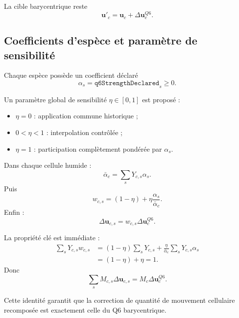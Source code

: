 \documentclass[11pt,a4paper]{article}
\newcommand{\vect}[1]{\bm{#1}}
\begin{document}
La cible barycentrique reste
\begin{equation}
  \vect{u}'_c=\vect{u}_c+\Delta\vect{u}^{Q6}_c.
\end{equation}

\subsection{Coefficients d'espèce et paramètre de sensibilité}

Chaque espèce possède un coefficient déclaré
\begin{equation}
  \alpha_s = \texttt{q6StrengthDeclared}_s \ge 0.
\end{equation}

Un paramètre global de sensibilité \(\eta\in[0,1]\) est proposé :
\begin{itemize}
  \item \(\eta=0\) : application commune historique ;
  \item \(0<\eta<1\) : interpolation contrôlée ;
  \item \(\eta=1\) : participation complètement pondérée par \(\alpha_s\).
\end{itemize}

Dans chaque cellule humide :
\begin{equation}
  \bar\alpha_c=\sum_sY_{c,s}\alpha_s.
\end{equation}
Puis
\begin{equation}
  w_{c,s}=(1-\eta)+\eta\frac{\alpha_s}{\bar\alpha_c}.
  \label{eq:species_weight}
\end{equation}
Enfin :
\begin{equation}
  \Delta\vect{u}_{c,s}=w_{c,s}\Delta\vect{u}^{Q6}_c.
  \label{eq:species_correction}
\end{equation}

La propriété clé est immédiate :
\begin{align}
 \sum_sY_{c,s}w_{c,s}
 &= (1-\eta)\sum_sY_{c,s}
   +\frac{\eta}{\bar\alpha_c}\sum_sY_{c,s}\alpha_s \\
 &= (1-\eta)+\eta=1.
\end{align}
Donc
\begin{equation}
  \sum_sM_{c,s}\Delta\vect{u}_{c,s}
  =M_c\Delta\vect{u}^{Q6}_c.
  \label{eq:momentum_identity}
\end{equation}

Cette identité garantit que la correction de quantité de mouvement cellulaire recomposée est exactement celle du Q6 barycentrique.
\end{document}
